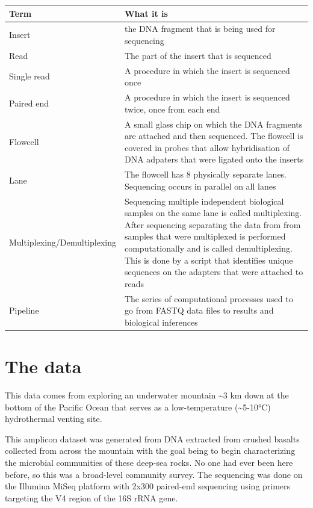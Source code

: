 \documentclass[
]{book}
\begin{document}
\begin{longtable}{ll}
\toprule
\textbf{Term} & \textbf{What it is}\\
\midrule
Insert & the DNA fragment that is being used for sequencing\\
Read & The part of the insert that is sequenced\\
Single read & A procedure in which the insert is sequenced once\\
Paired end & A procedure in which the insert is sequenced twice, once from each end\\
Flowcell & A small glass chip on which the DNA fragments are attached and then sequenced. The flowcell is covered in probes that allow hybridisation of DNA adpaters that were ligated onto the inserts\\
\addlinespace
Lane & The flowcell has 8 physically separate lanes. Sequencing occurs in parallel on all lanes\\
Multiplexing/Demultiplexing & Sequencing multiple independent biological samples on the same lane is called multiplexing. After sequencing separating the data from from samples that were multiplexed is performed computationally and is called demultiplexing. This is done by a script that identifies unique sequences on the adapters that were attached to reads\\
Pipeline & The series of computational processes used to go from FASTQ data files to results and biological inferences\\
\bottomrule
\end{longtable}

\hypertarget{the-data}{%
\section{The data}\label{the-data}}

This data comes from exploring an underwater mountain \textasciitilde3 km down at the bottom of the Pacific Ocean that serves as a low-temperature (\textasciitilde5-10°C) hydrothermal venting site.

This amplicon dataset was generated from DNA extracted from crushed basalts collected from across the mountain with the goal being to begin characterizing the microbial communities of these deep-sea rocks. No one had ever been here before, so this was a broad-level community survey. The sequencing was done on the Illumina MiSeq platform with 2x300 paired-end sequencing using primers targeting the V4 region of the 16S rRNA gene.
\end{document}
